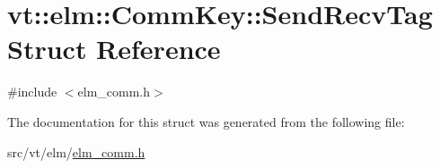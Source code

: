 \hypertarget{structvt_1_1elm_1_1_comm_key_1_1_send_recv_tag}{}\section{vt\+:\+:elm\+:\+:Comm\+Key\+:\+:Send\+Recv\+Tag Struct Reference}
\label{structvt_1_1elm_1_1_comm_key_1_1_send_recv_tag}


{\ttfamily \#include $<$elm\+\_\+comm.\+h$>$}



The documentation for this struct was generated from the following file\+:\begin{DoxyCompactItemize}
\item 
src/vt/elm/\hyperlink{elm__comm_8h}{elm\+\_\+comm.\+h}\end{DoxyCompactItemize}
